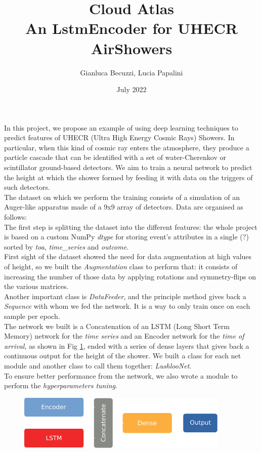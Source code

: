 \documentclass{article}
\title{Cloud Atlas \\[1ex] \large An LstmEncoder for UHECR AirShowers}
\author{Gianluca Becuzzi, Lucia Papalini}
\date{July 2022}
\begin{document}
\maketitle

In this project, we propose an example of using deep learning techniques to predict features of UHECR 
(Ultra High Energy Cosmic Rays) Showers.
In particular, when this kind of cosmic ray enters the atmosphere, they produce a particle cascade 
that can be identified with a set of water-Cherenkov or scintillator ground-based detectors. We aim to train a neural network to predict the height at which the shower formed by feeding it with data on the triggers of such detectors.\\
The dataset on which we perform the training consists of a simulation of an Auger-like apparatus 
made of a 9x9 array of detectors.  Data are organised as follows:
\\
The first step is splitting the dataset into the different features: the whole project is based on a custom NumPy \textit{dtype} for storing event's attributes in a single (?) sorted by \textit{toa}, \textit{time\_series} and \textit{outcome}.\\
First sight of the dataset showed the need for data augmentation at high values of height, so we built the \textit{Augmentation} class to perform that: it consists of increasing the number of those data by applying rotations and symmetry-flips on the various matrices.\\
Another important class is \textit{DataFeeder}, and the principle method gives back a \textit{Sequence} with whom we fed the network. It is a way to only train once on each sample per epoch.\\
The network we built is a Concatenation of an LSTM (Long Short Term Memory) network for the \textit{time series} and an Encoder network for the \textit{time of arrival}, as shown in Fig \ref{fig:network}, ended with a series of dense layers that gives back a continuous output for the height of the shower. We built a class for each net module and another class to call them together: \textit{LushlooNet}.\\
To ensure better performance from the network, we also wrote a module to perform the \textit{hyperparameters tuning}.
\begin{figure}
    \centering
    \includegraphics[width=0.9\textwidth]{figures/net_idea.pdf}
    \caption{}
    \label{fig:network}
\end{figure}
\end{document}
